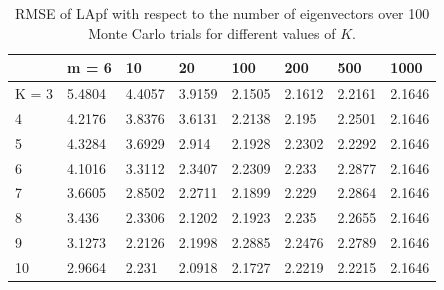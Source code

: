 \documentclass[10pt,letterpaper,final]{article}
\begin{document}
\begin{table}[H!]
\centering
\begin{tabular}{|l|l|l|l|l|l|l|l|}
\hline
        & m = 6  & 10     & 20     & 100    & 200    & 500    & 1000   \\ \hline
K = 3 & 5.4804 & 4.4057 & 3.9159 & 2.1505 & 2.1612 & 2.2161 & 2.1646 \\ \hline
4       & 4.2176 & 3.8376 & 3.6131 & 2.2138 & 2.195  & 2.2501 & 2.1646 \\ \hline
5       & 4.3284 & 3.6929 & 2.914  & 2.1928 & 2.2302 & 2.2292 & 2.1646 \\ \hline
6       & 4.1016 & 3.3112 & 2.3407 & 2.2309 & 2.233  & 2.2877 & 2.1646 \\ \hline
7       & 3.6605 & 2.8502 & 2.2711 & 2.1899 & 2.229  & 2.2864 & 2.1646 \\ \hline
8       & 3.436  & 2.3306 & 2.1202 & 2.1923 & 2.235  & 2.2655 & 2.1646 \\ \hline
9       & 3.1273 & 2.2126 & 2.1998 & 2.2885 & 2.2476 & 2.2789 & 2.1646 \\ \hline
10      & 2.9664 & 2.231  & 2.0918 & 2.1727 & 2.2219 & 2.2215 & 2.1646 \\ \hline
\end{tabular}
\caption{RMSE of LApf with respect to the number of eigenvectors over 100 Monte Carlo trials for different values of $K$.}
\label{tab:RMSE_LApf}
\end{table}

%
\end{document}
